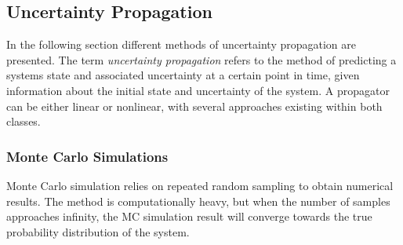 




\subsection{Uncertainty Propagation}

In the following section different methods of uncertainty propagation are presented. The term \textit{uncertainty propagation} refers to the method of predicting a systems state and associated uncertainty at a certain point in time, given information about the initial state and uncertainty of the system. A propagator can be either linear or nonlinear, with several approaches existing within both classes. \\


\subsubsection{Monte Carlo Simulations}

Monte Carlo simulation relies on repeated random sampling to obtain numerical results. The method is computationally heavy, but when the number of samples approaches infinity, the MC simulation result will converge towards the true probability distribution of the system. \\


